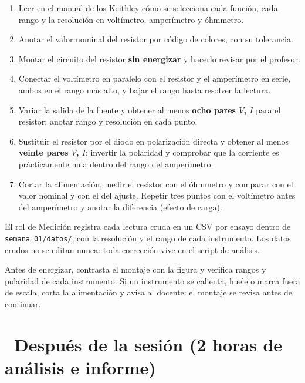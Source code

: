 \documentclass[11pt,a4paper]{article}
\newcommand{\iconotexto}[2]{\textcolor{cyanNeon}{\faIcon{#1}}~#2}
\begin{document}
\begin{enumerate}[leftmargin=1.6em,itemsep=2pt,topsep=3pt]
  \item Leer en el manual de los Keithley cómo se selecciona cada función, cada rango y la resolución en voltímetro, amperímetro y óhmmetro.
  \item Anotar el valor nominal del resistor por código de colores, con su tolerancia.
  \item Montar el circuito del resistor \textbf{sin energizar} y hacerlo revisar por el profesor.
  \item Conectar el voltímetro en paralelo con el resistor y el amperímetro en serie, ambos en el rango más alto, y bajar el rango hasta resolver la lectura.
  \item Variar la salida de la fuente y obtener al menos \textbf{ocho pares $V$, $I$} para el resistor; anotar rango y resolución en cada punto.
  \item Sustituir el resistor por el diodo en polarización directa y obtener al menos \textbf{veinte pares $V$, $I$}; invertir la polaridad y comprobar que la corriente es prácticamente nula dentro del rango del amperímetro.
  \item Cortar la alimentación, medir el resistor con el óhmmetro y comparar con el valor nominal y con el del ajuste. Repetir tres puntos con el voltímetro antes del amperímetro y anotar la diferencia (efecto de carga).
\end{enumerate}

\begin{cajaRecuerda}El rol de Medición registra cada lectura cruda en un CSV por ensayo dentro de \texttt{semana\_01/datos/}, con la resolución y el rango de cada instrumento. Los datos crudos no se editan nunca: toda corrección vive en el script de análisis.\end{cajaRecuerda}

\begin{tcolorbox}[cajaRecomendacion]
Antes de energizar, contrasta el montaje con la figura y verifica rangos y polaridad de cada instrumento. Si un instrumento se calienta, huele o marca fuera de escala, corta la alimentación y avisa al docente: el montaje se revisa antes de continuar.
\end{tcolorbox}

\section{\iconotexto{chart-line}{Después de la sesión (2 horas de análisis e informe)}}
\end{document}
